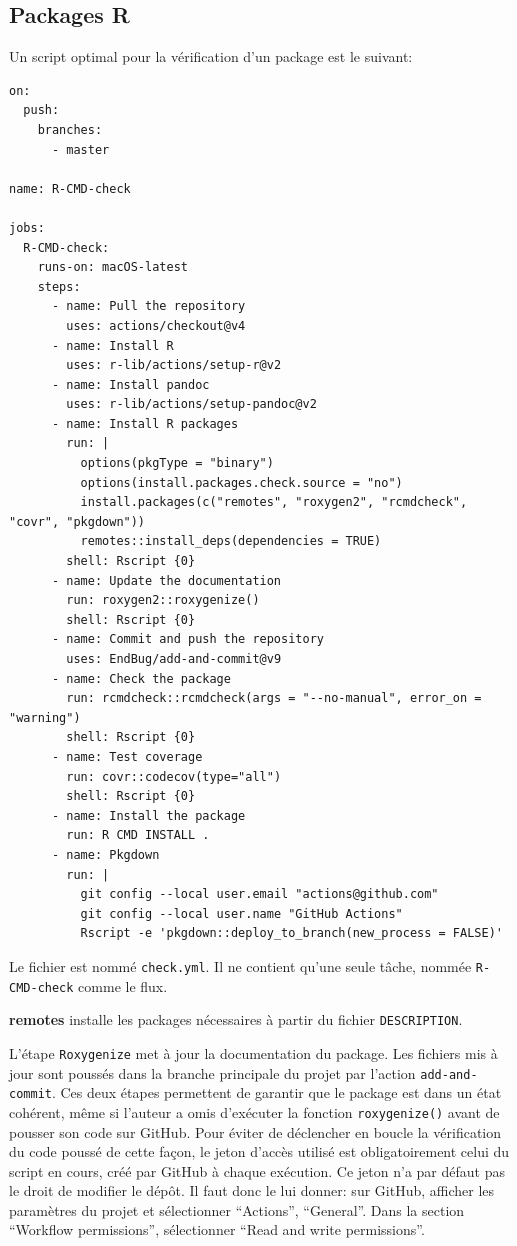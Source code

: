 \documentclass[
  12pt,
  french,
  a4paper,
  extrafontsizes,onecolumn,openright
  ]{memoir}
\begin{document}
\subsection{Packages R}\label{sec:package-ci6}

Un script optimal pour la vérification d'un package est le suivant:

\begin{verbatim}
on:
  push:
    branches:
      - master

name: R-CMD-check

jobs:
  R-CMD-check:
    runs-on: macOS-latest
    steps:
      - name: Pull the repository
        uses: actions/checkout@v4
      - name: Install R
        uses: r-lib/actions/setup-r@v2
      - name: Install pandoc
        uses: r-lib/actions/setup-pandoc@v2
      - name: Install R packages
        run: |
          options(pkgType = "binary")
          options(install.packages.check.source = "no")
          install.packages(c("remotes", "roxygen2", "rcmdcheck", "covr", "pkgdown"))
          remotes::install_deps(dependencies = TRUE)
        shell: Rscript {0}
      - name: Update the documentation
        run: roxygen2::roxygenize()
        shell: Rscript {0}
      - name: Commit and push the repository
        uses: EndBug/add-and-commit@v9
      - name: Check the package
        run: rcmdcheck::rcmdcheck(args = "--no-manual", error_on = "warning")
        shell: Rscript {0}
      - name: Test coverage
        run: covr::codecov(type="all")
        shell: Rscript {0}
      - name: Install the package
        run: R CMD INSTALL .
      - name: Pkgdown
        run: |
          git config --local user.email "actions@github.com"
          git config --local user.name "GitHub Actions"
          Rscript -e 'pkgdown::deploy_to_branch(new_process = FALSE)'
\end{verbatim}

Le fichier est nommé \texttt{check.yml}.
Il ne contient qu'une seule tâche, nommée \texttt{R-CMD-check} comme le flux.

\textbf{remotes} installe les packages nécessaires à partir du fichier \texttt{DESCRIPTION}.

L'étape \texttt{Roxygenize} met à jour la documentation du package.
Les fichiers mis à jour sont poussés dans la branche principale du projet par l'action \texttt{add-and-commit}.
Ces deux étapes permettent de garantir que le package est dans un état cohérent, même si l'auteur a omis d'exécuter la fonction \texttt{roxygenize()} avant de pousser son code sur GitHub.
Pour éviter de déclencher en boucle la vérification du code poussé de cette façon, le jeton d'accès utilisé est obligatoirement celui du script en cours, créé par GitHub à chaque exécution.
Ce jeton n'a par défaut pas le droit de modifier le dépôt.
Il faut donc le lui donner: sur GitHub, afficher les paramètres du projet et sélectionner \enquote{Actions}, \enquote{General}.
Dans la section \enquote{Workflow permissions}, sélectionner \enquote{Read and write permissions}.
\end{document}

